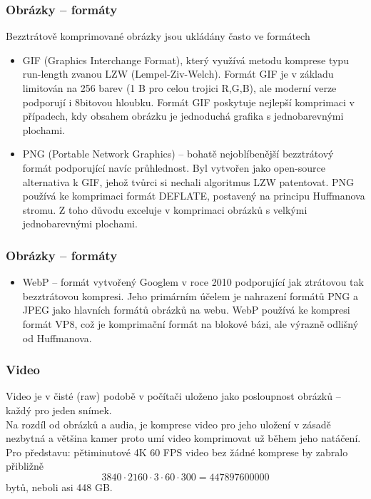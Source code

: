 \documentclass[aspectratio=169,11pt,svgnames,handout]{beamer}
\begin{document}
\begin{frame}
 \frametitle{Obrázky -- formáty}
 Bezztrátově komprimované obrázky jsou ukládány často ve formátech
 \begin{itemize}[label=\textbullet]
  \item \alert{GIF} (Graphics Interchange Format), který využívá metodu komprese
   typu run-length zvanou LZW (Lempel-Ziv-Welch). Formát GIF je v základu
   limitován na 256 barev (1 B pro celou trojici R,G,B), ale moderní verze
   podporují i 8bitovou hloubku. Formát GIF poskytuje nejlepší komprimaci v
   případech, kdy obsahem obrázku je jednoduchá grafika s jednobarevnými
   plochami.
  \pause
  \item \alert{PNG} (Portable Network Graphics) -- bohatě nejoblíbenější
   bezztrátový formát podporující navíc \alert{průhlednost}. Byl vytvořen jako
   open-source alternativa k GIF, jehož tvůrci si nechali algoritmus LZW
   patentovat. PNG používá ke komprimaci formát DEFLATE, postavený na principu
   Huffmanova stromu. Z toho důvodu exceluje v komprimaci obrázků s velkými
   jednobarevnými plochami.
 \end{itemize}
\end{frame}

\begin{frame}
 \frametitle{Obrázky -- formáty}
 \begin{itemize}[label=\textbullet]
  \item \alert{WebP} -- formát vytvořený Googlem v roce 2010 podporující jak
   ztrátovou tak bezztrátovou kompresi. Jeho primárním účelem je nahrazení
   formátů PNG a JPEG jako hlavních formátů obrázků na webu. WebP používá ke
   kompresi formát \alert{VP8}, což je komprimační formát na blokové bázi, ale
   výrazně odlišný od Huffmanova.
 \end{itemize}
\end{frame}

\begin{frame}
 \frametitle{Video}
 Video je v čisté (raw) podobě v počítači uloženo jako posloupnost obrázků --
 každý pro jeden snímek.\pause\\
 Na rozdíl od obrázků a audia, je komprese video pro jeho uložení v zásadě
 nezbytná a většina kamer proto umí video komprimovat už během jeho
 natáčení.\pause\\
 Pro představu: pětiminutové 4K 60 FPS video bez žádné komprese by zabralo
 přibližně
 \[
  3840 \cdot 2160 \cdot 3 \cdot 60 \cdot 300 = 447897600000
 \]
 bytů, neboli asi 448 GB.
\end{frame}
\end{document}
